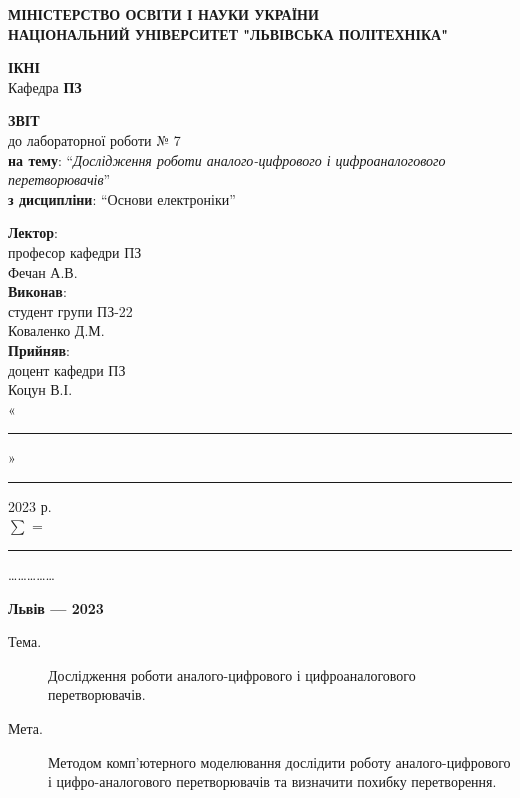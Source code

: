 \documentclass{article}
\newcommand\subject{Основи електроніки}
\newcommand\lecturer{професор кафедри ПЗ \\ Фечан А.В.}
\newcommand\teacher{доцент кафедри ПЗ \\ Коцун В.І.}
\newcommand\mygroup{ПЗ-22}
\newcommand\lab{7}
\newcommand\theme{Дослідження роботи аналого-цифрового і цифроаналогового перетворювачів}
\newcommand\purpose{Методом комп'ютерного моделювання дослідити роботу
	аналого-цифрового і цифро-аналогового перетворювачів та визначити похибку
	перетворення}
\begin{document}
\begin{normalsize}
	\begin{titlepage}
		\thispagestyle{empty}
		\begin{center}
			\textbf{МІНІСТЕРСТВО ОСВІТИ І НАУКИ УКРАЇНИ\\
				НАЦІОНАЛЬНИЙ УНІВЕРСИТЕТ "ЛЬВІВСЬКА ПОЛІТЕХНІКА"}
		\end{center}
		\begin{flushright}
			\textbf{ІКНІ}\\
			Кафедра \textbf{ПЗ}
		\end{flushright}
		\vspace{200pt}
		\begin{center}
			\textbf{ЗВІТ}\\
			\vspace{10pt}
			до лабораторної роботи № \lab\\
			\textbf{на тему}: “\textit{\theme}”\\
			\textbf{з дисципліни}: “\subject”
		\end{center}
		\vspace{112pt}
		\begin{flushright}
			
			\textbf{Лектор}:\\
			\lecturer\\
			\vspace{28pt}
			\textbf{Виконав}:\\
			
			студент групи \mygroup\\
			Коваленко Д.М.\\
			\vspace{28pt}
			\textbf{Прийняв}:\\
			
			\teacher\\
			
			\vspace{28pt}
			«\rule{1cm}{0.15mm}» \rule{1.5cm}{0.15mm} 2023 р.\\
			$\sum$ = \rule{1cm}{0.15mm}……………\\
			
		\end{flushright}
		\vspace{\fill}
		\begin{center}
			\textbf{Львів — 2023}
		\end{center}
	\end{titlepage}
		
	\begin{description}
		\item[Тема.] \theme.
		\item[Мета.] \purpose.
	\end{description}


\end{normalsize}
\end{document}
